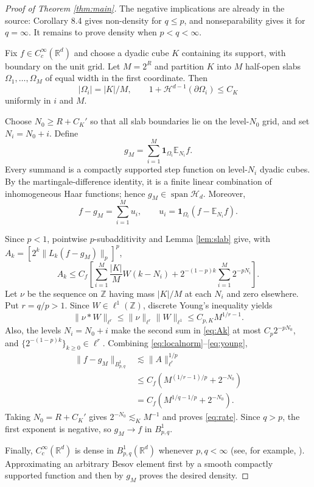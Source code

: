 \documentclass[11pt]{article}
\newcommand{\R}{\mathbb R}
\newcommand{\E}{\mathbb E}
\newcommand{\Haar}{\mathcal H_d}
\newcommand{\Span}{\operatorname{span}}
\newcommand{\1}{\mathbf 1}
\begin{document}
\begin{proof}[Proof of Theorem \ref{thm:main}]
The negative implications are already in the source: Corollary 8.4 gives
non-density for $q\le p$, and nonseparability gives it for $q=\infty$.
It remains to prove density when $p<q<\infty$.

Fix $f\in C_c^\infty(\R^d)$ and choose a dyadic cube $K$ containing its
support, with boundary on the unit grid.  Let $M=2^R$ and partition $K$ into
$M$ half-open slabs $\Omega_1,\ldots,\Omega_M$ of equal width in the first
coordinate.  Then
\begin{equation}\label{eq:slabgeometry}
 |\Omega_i|=|K|/M,\qquad
 1+\mathcal H^{d-1}(\partial\Omega_i)\le C_K
\end{equation}
uniformly in $i$ and $M$.

Choose $N_0\ge R+C_K'$ so that all slab boundaries lie on the level-$N_0$
grid, and set $N_i=N_0+i$.  Define
\begin{equation}\label{eq:gM}
                  g_M=\sum_{i=1}^M\1_{\Omega_i}\E_{N_i}f.
\end{equation}
Every summand is a compactly supported step function on level-$N_i$ dyadic
cubes.  By the martingale-difference identity, it is a finite linear
combination of inhomogeneous Haar functions; hence $g_M\in\Span\Haar$.
Moreover,
\[
 f-g_M=\sum_{i=1}^M u_i,
 \qquad u_i=\1_{\Omega_i}(f-\E_{N_i}f).
\]

Since $p<1$, pointwise $p$-subadditivity and Lemma \ref{lem:slab} give, with
$A_k=[2^k\|L_k(f-g_M)\|_p]^p$,
\begin{equation}\label{eq:Ak}
 A_k\le C_f\left[
   \sum_{i=1}^M\frac{|K|}{M}W(k-N_i)
   +2^{-(1-p)k}\sum_{i=1}^M2^{-pN_i}
 \right].
\end{equation}
Let $\nu$ be the sequence on $\mathbb Z$ having mass $|K|/M$ at each
$N_i$ and zero elsewhere.  Put $r=q/p>1$.  Since $W\in\ell^1(\mathbb Z)$,
discrete Young's inequality yields
\begin{equation}\label{eq:young}
 \|\nu*W\|_{\ell^r}
 \le\|\nu\|_{\ell^r}\|W\|_{\ell^1}
 \le C_{p,K}M^{1/r-1}.
\end{equation}
Also, the levels $N_i=N_0+i$ make the second sum in \eqref{eq:Ak} at most
$C_p2^{-pN_0}$, and $\{2^{-(1-p)k}\}_{k\ge0}\in\ell^r$.
Combining \eqref{eq:localnorm}--\eqref{eq:young},
\begin{align*}
 \|f-g_M\|_{B^1_{p,q}}
 &\lesssim \|A\|_{\ell^r}^{1/p}\\
 &\le C_f\left(M^{(1/r-1)/p}+2^{-N_0}\right)\\
 &=C_f\left(M^{1/q-1/p}+2^{-N_0}\right).
\end{align*}
Taking $N_0=R+C_K'$ gives $2^{-N_0}\lesssim_K M^{-1}$ and proves
\eqref{eq:rate}.  Since $q>p$, the first exponent is negative, so
$g_M\to f$ in $B^1_{p,q}$.

Finally, $C_c^\infty(\R^d)$ is dense in $B^1_{p,q}(\R^d)$ whenever
$p,q<\infty$ (see, for example, \cite{Triebel}).  Approximating an arbitrary
Besov element first by a smooth compactly supported function and then by
$g_M$ proves the desired density.
\end{proof}
\end{document}
